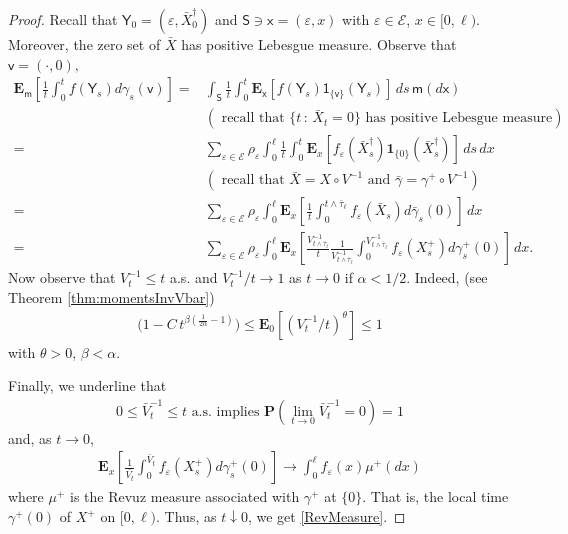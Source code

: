 \documentclass[[11pt,a4paper,reqno]{article}
\numberwithin{equation}{section}
\begin{document}
\begin{proof}
Recall that $\mathsf{Y}_0 = (\varepsilon, \bar{X}^\dagger_0)$ and $\mathsf{S} \ni \mathsf{x} = (\varepsilon, x)$ with $\varepsilon \in \mathcal{E}$, $x \in [0, \ell)$. Moreover, the zero set of $\bar{X}$ has positive Lebesgue measure. Observe that $\mathsf{v}=(\cdot, 0),$  
\begin{align*}
\mathbf{E}_{\mathsf{m}} \left[ \frac{1}{t} \int_0^t f(\mathsf{Y}_s) d\gamma_s(\mathsf{v}) \right]
= & \int_{\mathsf{S}}\frac{1}{t} \int_0^t  \mathbf{E}_{\mathsf{x}}[f(\mathsf{Y}_s) \mathsf{1}_{\{\mathsf{v}\}}(\mathsf{Y}_s)] \, ds\, \mathsf{m}(d\mathsf{x})\\
 &( \textrm{ recall that } \{t\,:\, \bar{X}_t=0\} \textrm{ has positive Lebesgue measure})\\
= & \sum_{\varepsilon \in \mathcal{E} }  \rho_\varepsilon \int_0^\ell  \frac{1}{t} \int_0^t    \mathbf{E}_x[f_\varepsilon(\bar{X}^\dagger_s) \mathbf{1}_{\{0\}}(\bar{X}^\dagger_s)] \, ds\, dx\\
& (\textrm{ recall that } \bar{X} = X \circ V^{-1} \textrm{ and } \bar{\gamma} = \gamma^+ \circ V^{-1})\\
= & \sum_{\varepsilon \in \mathcal{E} }  \rho_\varepsilon \int_0^\ell  \mathbf{E}_x \left[ \frac{1}{t} \int_0^{t \wedge \bar{\tau}_\ell} f_\varepsilon(\bar{X}_s) d\bar{\gamma}_s(0) \right]\, dx\\
= & \sum_{\varepsilon \in \mathcal{E} }  \rho_\varepsilon \int_0^\ell  \mathbf{E}_x \left[ \frac{V^{-1}_{t \wedge \bar{\tau}_\ell}}{t} \frac{1}{V^{-1}_{t \wedge \bar{\tau}_\ell}} \int_0^{V^{-1}_{t \wedge \bar{\tau}_\ell}} f_\varepsilon(X^+_s) d\gamma^+_s(0) \right]\, dx.
\end{align*}
Now observe that $V^{-1}_t \leq t$ a.s. and $V^{-1}_t/t \to 1$ as $t \to 0$ if $\alpha < 1/2$. Indeed, (see Theorem \ref{thm:momentsInvVbar})
    \begin{align}
         \big( 1 - C\, t^{\beta (\frac{1}{2\alpha} -1)}\big) \leq \mathbf{E}_0[(V^{-1}_t / t)^\theta] \leq 1
         \label{fMomInvVbarINproof}
    \end{align}
with $\theta>0$, $\beta < \alpha$. 

Finally, we underline that
\begin{align}
0 \leq \bar{V}^{-1}_t \leq t \textrm{ a.s. implies }  \mathbf{P}(\lim_{t \to 0} \bar{V}^{-1}_t = 0)=1
\end{align}
and, as $t \to 0$,
\begin{align*}
\mathbf{E}_x \left[ \frac{1}{\bar{V_t}} \int_0^{\bar{V}_t} f_\varepsilon(X^+_s) d\gamma^+_s(0)\right] \to \int_0^\ell f_\varepsilon(x) \mu^+(dx)
\end{align*}
where $\mu^+$ is the Revuz measure associated with $\gamma^+$ at $\{0\}$. That is, the local time $\gamma^+(0)$ of $X^+$ on $[0, \ell)$. Thus, as $t \downarrow 0$, we get \eqref{RevMeasure}.
\end{proof}
\end{document}
